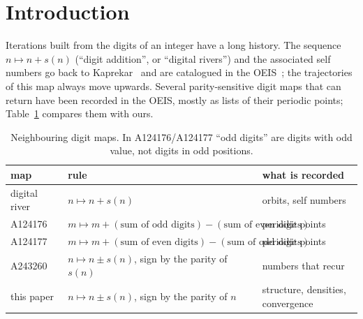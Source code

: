 \documentclass[11pt]{article}
\theoremstyle{definition}
\theoremstyle{remark}
\begin{document}
\begin{abstract}
Finally we treat every base $b$. In odd bases every orbit reaches $0$. In
every even base, including base $2$ where the carry mechanism takes a
different form, the structural results carry over and the $2$-cycles again
have density of exact order $(\log D)^{-1/2}$, with resonances at the base-$b$
repunits $b^j-1$.

\medskip
\noindent\textbf{MSC 2020:} 11A63 (primary); 60J10, 60F05, 11K65.\\
\noindent\textbf{Keywords:} digit sum, carries, Markov chain, local limit
theorem, periodic points, arithmetic dynamics, computer-assisted proof.
\end{abstract}

\section{Introduction}

Iterations built from the digits of an integer have a long history. The
sequence $n\mapsto n+s(n)$ (``digit addition'', or ``digital rivers'') and
the associated self numbers go back to Kaprekar~\cite{Kaprekar} and are
catalogued in the OEIS~\cite{OEIS-A004207,OEIS-A003052}; the trajectories of
this map always move upwards. Several parity-sensitive digit maps that can
return have been recorded in the OEIS, mostly as lists of their periodic
points; Table~\ref{tab:related} compares them with ours.

\begin{table}[h]
\centering
\small
\begin{tabular}{>{\raggedright}p{2.6cm}>{\raggedright}p{6.3cm}>{\raggedright\arraybackslash}p{3.6cm}}
\toprule
map & rule & what is recorded\\
\midrule
digital river~\cite{OEIS-A004207} & $n\mapsto n+s(n)$ & orbits, self numbers~\cite{OEIS-A003052}\\
A124176~\cite{OEIS-A124176} & $m\mapsto m+(\text{sum of odd digits})-(\text{sum of even digits})$ & periodic points\\
A124177~\cite{OEIS-A124177} & $m\mapsto m+(\text{sum of even digits})-(\text{sum of odd digits})$ & periodic points\\
A243260~\cite{OEIS-A243260} & $n\mapsto n\pm s(n)$, sign by the parity of $s(n)$ & numbers that recur\\
this paper & $n\mapsto n\pm s(n)$, sign by the parity of $n$ & structure, densities, convergence\\
\bottomrule
\end{tabular}
\caption{Neighbouring digit maps. In A124176/A124177 ``odd digits'' are
digits with odd value, not digits in odd positions.}\label{tab:related}
\end{table}
\end{document}
